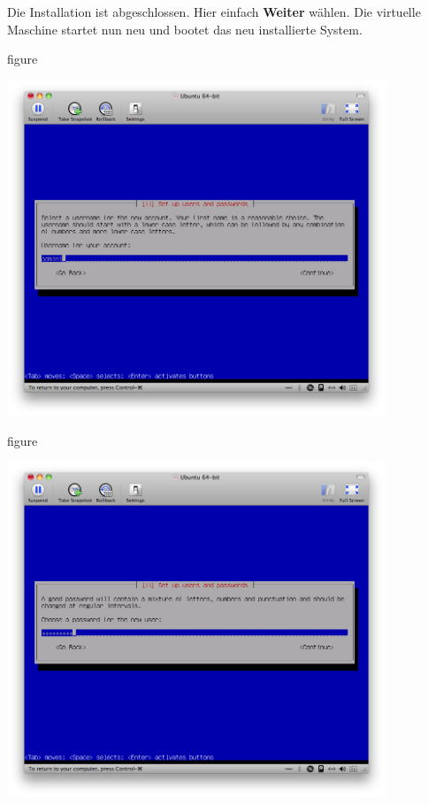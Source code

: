 \pagebreak
Die Installation ist abgeschlossen. Hier einfach \textbf{Weiter} wählen. Die virtuelle Maschine startet nun neu und
bootet das neu installierte System.

\begin{nofloat}{figure}
\begin{center}
\includegraphics[width=0.85\textwidth]{screenshots/29_ubuntu_install.png}
\end{center}
\end{nofloat}


\begin{nofloat}{figure}
\begin{center}
\includegraphics[width=0.85\textwidth]{screenshots/30_ubuntu_install.png}
\end{center}
\end{nofloat}


